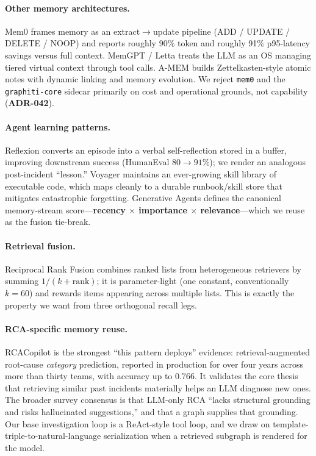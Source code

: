 \documentclass[11pt]{article}
\begin{document}
\paragraph{Other memory architectures.}
Mem0 \citep{chhikara2025mem0} frames memory as an extract$\to$update pipeline
(ADD / UPDATE / DELETE / NOOP) and reports roughly 90\% token and roughly 91\%
p95-latency savings versus full context. MemGPT / Letta \citep{packer2023memgpt}
treats the LLM as an OS managing tiered virtual context through tool calls. A-MEM
\citep{xu2025amem} builds Zettelkasten-style atomic notes with dynamic linking
and memory evolution. We reject \texttt{mem0} and the \texttt{graphiti-core}
sidecar primarily on cost and operational grounds, not capability
(\textbf{ADR-042}).

\paragraph{Agent learning patterns.}
Reflexion \citep{shinn2023reflexion} converts an episode into a verbal
self-reflection stored in a buffer, improving downstream success (HumanEval
$80 \to 91\%$); we render an analogous post-incident ``lesson.'' Voyager
\citep{wang2023voyager} maintains an ever-growing skill library of executable
code, which maps cleanly to a durable runbook/skill store that mitigates
catastrophic forgetting. Generative Agents \citep{park2023generative} defines the
canonical memory-stream score---\textbf{recency $\times$ importance $\times$
relevance}---which we reuse as the fusion tie-break.

\paragraph{Retrieval fusion.}
Reciprocal Rank Fusion \citep{cormack2009rrf} combines ranked lists from
heterogeneous retrievers by summing $1/(k + \mathrm{rank})$; it is parameter-light
(one constant, conventionally $k=60$) and rewards items appearing across multiple
lists. This is exactly the property we want from three orthogonal recall legs.

\paragraph{RCA-specific memory reuse.}
RCACopilot \citep{chen2024rcacopilot} is the strongest ``this pattern deploys''
evidence: retrieval-augmented root-cause \emph{category} prediction, reported in
production for over four years across more than thirty teams, with accuracy up to
0.766. It validates the core thesis that retrieving similar past incidents
materially helps an LLM diagnose new ones. The broader survey consensus
\citep{survey2024rca} is that LLM-only RCA ``lacks structural grounding and risks
hallucinated suggestions,'' and that a graph supplies that grounding. Our base
investigation loop is a ReAct-style \citep{yao2022react} tool loop, and we draw on
template-triple-to-natural-language serialization \citep{wu2024simple} when a
retrieved subgraph is rendered for the model.
\end{document}
